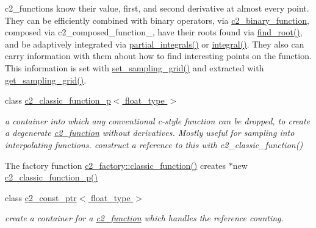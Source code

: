 \begin{DoxyCompactItemize}
\begin{DoxyCompactList}
c2\+\_\+functions know their value, first, and second derivative at almost every point. They can be efficiently combined with binary operators, via \hyperlink{classc2__binary__function}{c2\+\_\+binary\+\_\+function}, composed via c2\+\_\+composed\+\_\+function\+\_\+, have their roots found via \hyperlink{classc2__function_acd17a7191226578c866d82cb2e9ff89f}{find\+\_\+root()}, and be adaptively integrated via \hyperlink{classc2__function_a89ce5e2f44ebfaf9eb4d66605cde4fde}{partial\+\_\+integrals()} or \hyperlink{classc2__function_a675c5056562332be2e49b38485d322b7}{integral()}. They also can carry information with them about how to find \textquotesingle{}interesting\textquotesingle{} points on the function. This information is set with \hyperlink{classc2__function_a23828c75121b442899ab7a80cf5abbb0}{set\+\_\+sampling\+\_\+grid()} and extracted with \hyperlink{classc2__function_ad03264dcc015e5d0b1b6eb30df3f32be}{get\+\_\+sampling\+\_\+grid()}. \end{DoxyCompactList}\item 
class \hyperlink{classc2__classic__function__p}{c2\+\_\+classic\+\_\+function\+\_\+p$<$ float\+\_\+type $>$}
\begin{DoxyCompactList}\small\item\em a container into which any conventional c-\/style function can be dropped, to create a degenerate \hyperlink{classc2__function}{c2\+\_\+function} without derivatives. Mostly useful for sampling into interpolating functions. construct a reference to this with c2\+\_\+classic\+\_\+function()

The factory function \hyperlink{classc2__factory_ae5c9140b2bfcc6416682562b99479974}{c2\+\_\+factory\+::classic\+\_\+function()} creates $\ast$new \hyperlink{classc2__classic__function__p_a8b2d09d67a8835902fd6c684d5b183b7}{c2\+\_\+classic\+\_\+function\+\_\+p()} \end{DoxyCompactList}\item 
class \hyperlink{classc2__const__ptr}{c2\+\_\+const\+\_\+ptr$<$ float\+\_\+type $>$}
\begin{DoxyCompactList}\small\item\em create a container for a \hyperlink{classc2__function}{c2\+\_\+function} which handles the reference counting.


\end{DoxyCompactList}
\end{DoxyCompactItemize}
